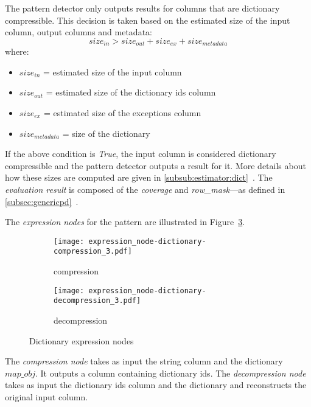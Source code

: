 The pattern detector only outputs results for columns that are dictionary compressible. This decision is taken based on the estimated size of the input column, output columns and metadata:
\begin{equation}
\label{eq:pd:dict:outputcondition}
    size_{in} > size_{out} + size_{ex} + size_{metadata}
\end{equation}
where:
\begin{itemize}
    \item[] \(size_{in}\) = estimated size of the input column
    \item[] \(size_{out}\) = estimated size of the dictionary ids column
    \item[] \(size_{ex}\) = estimated size of the exceptions column
    \item[] \(size_{metadata}\) = size of the dictionary
\end{itemize}

If the above condition is \textit{True}, the input column is considered dictionary compressible and the pattern detector outputs a result for it. More details about how these sizes are computed are given in \ref{subsub:estimator:dict}~. The \textit{evaluation result} is composed of the \textit{coverage} and \textit{row\_mask}---as defined in \ref{subsec:genericpd}~.

The \textit{expression nodes} for the  pattern are illustrated in Figure~\ref{fig:pd:dict:exprnode}.

\begin{figure}[h]
  \centering
  \begin{subfigure}[t]{0.4\linewidth}
    \centering
    \texttt{[image: expression\_node-dictionary-compression\_3.pdf]}
    \caption[b]{compression}
    \label{fig:pd:dict:exprnode:compression}
  \end{subfigure}
  \hspace{1em}
  \begin{subfigure}[t]{0.4\linewidth}
    \centering
    \texttt{[image: expression\_node-dictionary-decompression\_3.pdf]}
    \caption[b]{decompression}
    \label{fig:pd:dict:exprnode:decompression}
  \end{subfigure}
  \caption{Dictionary expression nodes}
  \label{fig:pd:dict:exprnode}
\end{figure}

The \textit{compression node} takes as input the string column and the dictionary \(map\_obj\). It outputs a column containing dictionary ids. The \textit{decompression node} takes as input the dictionary ids column and the dictionary and reconstructs the original input column.

